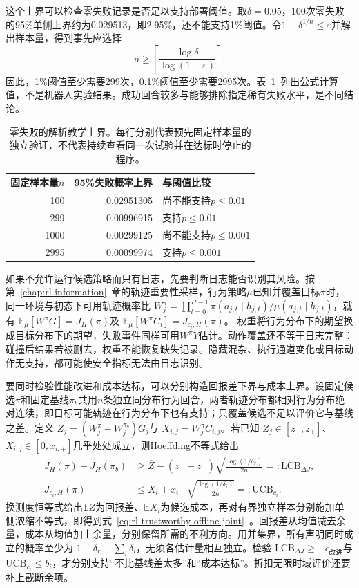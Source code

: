 这个上界可以检查零失败记录是否足以支持部署阈值。取$\delta=0.05$，100次零失败的95\%单侧上界约为0.029513，即2.95\%，还不能支持1\%阈值。令$1-\delta^{1/n}\leq\varepsilon$并解出样本量，得到事先应选择
\[
  n\geq
  \left\lceil\frac{\log\delta}{\log(1-\varepsilon)}\right\rceil.
\]
因此，1\%阈值至少需要299次，0.1\%阈值至少需要2995次。表~\ref{tab:rl-trustworthy-zero-failure}~列出公式计算值，不是机器人实验结果。成功回合较多与能够排除指定稀有失败水平，是不同结论。

\begin{table}[htbp]
  \centering
  \begin{tabular}{@{}rrl@{}}
    \toprule
    固定样本量$n$ & 95\%失败概率上界 & 与阈值比较 \\
    \midrule
    100  & 0.02951305 & 尚不能支持$p\leq0.01$ \\
    299  & 0.00996915 & 支持$p\leq0.01$ \\
    1000 & 0.00299125 & 尚不能支持$p\leq0.001$ \\
    2995 & 0.00099974 & 支持$p\leq0.001$ \\
    \bottomrule
  \end{tabular}
  \caption{零失败的解析教学上界。每行分别代表预先固定样本量的独立验证，不代表持续查看同一次试验并在达标时停止的程序。}
  \label{tab:rl-trustworthy-zero-failure}
\end{table}

如果不允许运行候选策略而只有日志，先要判断日志能否识别其风险。按第~\ref{chap:rl-information}~章的轨迹重要性采样，行为策略$\mu$已知并覆盖目标$\pi$时，同一环境与初态下可用轨迹概率比
$W_j^\pi=\prod_{t=0}^{H-1}\pi(a_{j,t}\mid h_{j,t})/
\mu(a_{j,t}\mid h_{j,t})$，就有
$\mathbb E_\mu[W^\pi G]=J_H(\pi)$及
$\mathbb E_\mu[W^\pi C_i]=J_{c_i,H}(\pi)$。
权重将行为分布下的期望换成目标分布下的期望，失败事件同样可用$W^\pi Y$估计。动作覆盖还不等于日志完整：碰撞后结果若被删去，权重不能恢复缺失记录。隐藏混杂、执行通道变化或目标动作无支持，都可能使安全指标无法由日志识别。

要同时检验性能改进和成本达标，可以分别构造回报差下界与成本上界。设固定候选$\pi$和固定基线$\pi_b$共用$n$条独立同分布行为回合，两者轨迹分布都相对行为分布绝对连续，即目标可能轨迹在行为分布下也有支持；只覆盖候选不足以评价它与基线之差。定义
$Z_j=(W_j^\pi-W_j^{\pi_b})G_j$与
$X_{i,j}=W_j^\pi C_{i,j}$。若已知
$Z_j\in[z_-,z_+]$、$X_{i,j}\in[0,x_{i,+}]$几乎处处成立，则Hoeffding不等式给出
\begin{align}
  J_H(\pi)-J_H(\pi_b)
     &\geq \overline Z
        -(z_+-z_-)\sqrt{\frac{\log(1/\delta_r)}{2n}}
        =:\mathrm{LCB}_{\Delta J}, \nonumber\\
  J_{c_i,H}(\pi)
     &\leq \overline X_i
        +x_{i,+}\sqrt{\frac{\log(1/\delta_i)}{2n}}
        =:\mathrm{UCB}_{c_i}.
  \label{eq:rl-trustworthy-offline-joint}
\end{align}
换测度恒等式给出$\mathbb E Z$为回报差、$\mathbb E X_i$为候选成本，再对有界独立样本分别施加单侧浓缩不等式，即得到式~\eqref{eq:rl-trustworthy-offline-joint}~。回报差从均值减去余量，成本从均值加上余量，分别保留所需的不利方向。用并集界，所有声明同时成立的概率至少为
$1-\delta_r-\sum_i\delta_i$，无须各估计量相互独立。检验
$\mathrm{LCB}_{\Delta J}\geq-\epsilon_{\text{改进}}$与
$\mathrm{UCB}_{c_i}\leq b_i$，才分别支持“不比基线差太多”和“成本达标”。折扣无限时域评价还要补上截断余项。


